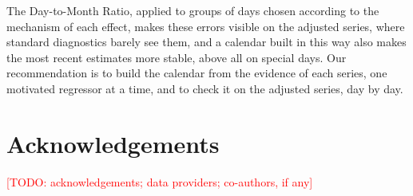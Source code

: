 \documentclass[Afour, times]{sagej}
\newcommand{\todo}[1]{\textcolor{red}{[TODO: #1]}}
\begin{document}
The Day-to-Month Ratio, applied to groups of days chosen according to the mechanism of each effect, makes these errors visible on the adjusted series, where standard diagnostics barely see them, and a calendar built in this way also makes the most recent estimates more stable, above all on special days. Our recommendation is to build the calendar from the evidence of each series, one motivated regressor at a time, and to check it on the adjusted series, day by day.



\section*{Acknowledgements}
\todo{acknowledgements; data providers; co-authors, if any}



\end{document}
